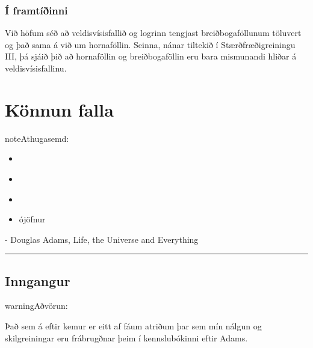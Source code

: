 \documentclass[a4paper,10pt,icelandic]{sphinxmanual}
\begin{document}
\subsection{Í framtíðinni}
\label{\detokenize{kafli04:i-framtiinni}}
Við höfum séð að veldisvísisfallið og logrinn tengjast breiðbogaföllunum
töluvert og það sama á við um hornaföllin. Seinna, nánar tiltekið í
Stærðfræðigreiningu III, þá sjáið þið að hornaföllin og breiðbogaföllin
eru bara mismunandi hliðar á veldisvísisfallinu.



\chapter{Könnun falla}
\label{\detokenize{kafli05:konnun-falla}}\label{\detokenize{kafli05::doc}}
\begin{sphinxadmonition}{note}{Athugasemd:}
\begin{itemize}
\item {} 
{\hyperref[\detokenize{kafli03:vaxandiminnkandi}]{}}

\item {} 
{\hyperref[\detokenize{kafli03:afleidur}]{}}

\item {} 
{\hyperref[\detokenize{kafli03:utgildi}]{}}

\item {} 
ójöfnur

\end{itemize}
\end{sphinxadmonition}


- Douglas Adams, Life, the Universe and Everything


\bigskip\hrule\bigskip



\section{Inngangur}
\label{\detokenize{kafli05:inngangur}}
\begin{sphinxadmonition}{warning}{Aðvörun:}

Það sem á eftir kemur er eitt af fáum atriðum þar sem mín nálgun og
skilgreiningar eru frábrugðnar þeim í kennslubókinni eftir Adams.
\end{sphinxadmonition}
\end{document}
